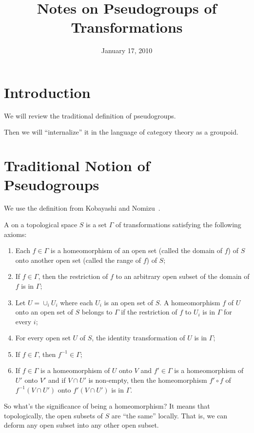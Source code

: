 \documentclass{article}
\title{Notes on Pseudogroups of Transformations}
\date{January 17, 2010}
\begin{document}
\maketitle
\tableofcontents

\section{Introduction}

We will review the traditional definition of pseudogroups.

Then we will ``internalize'' it in the language of category
theory as a groupoid.

\section{Traditional Notion of Pseudogroups}

We use the definition from Kobayashi and Nomizu~\cite{kobayashi1963foundations}.

\begin{defn}
A  on a topological space
$S$ is a set $\Gamma$ of transformations satisfying the following
axioms:
\begin{enumerate}
\item Each $f\in\Gamma$ is a homeomorphism of an open set (called
  the domain of $f$) of $S$ onto another open set (called the
  range of $f$) of $S$;
\item If $f\in\Gamma$, then the restriction of $f$ to an
  arbitrary open subset of the domain of $f$ is in $\Gamma$;
\item Let $U=\cup_{i}U_{i}$ where each $U_{i}$ is an open set of
  $S$. A homeomorphism $f$ of $U$ onto an open set of $S$ belongs
  to $\Gamma$ if the restriction of $f$ to $U_{i}$ is in $\Gamma$
  for every $i$;
\item For every open set $U$ of $S$, the identity transformation
  of $U$ is in $\Gamma$;
\item If $f\in\Gamma$, then $f^{-1}\in\Gamma$;
\item If $f\in\Gamma$ is a homeomorphism of $U$ onto $V$ and
  $f'\in\Gamma$ is a homeomorphism of $U'$ onto $V'$ and if
  $V\cap U'$ is non-empty, then the homeomorphism $f'\circ f$ of
  $f^{-1}(V\cap U')$ onto $f'(V\cap U')$ is in $\Gamma$.
\end{enumerate}
\end{defn}

So what's the significance of being a homeomorphism? It means
that topologically, the open subsets of $S$ are ``the same''
locally. That is, we can deform any open subset into any other
open subset.
\end{document}
